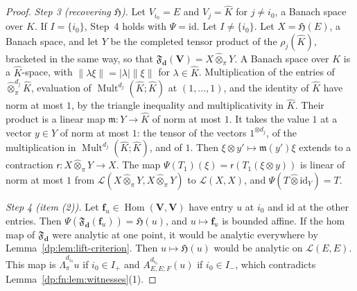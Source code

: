 \documentclass[11pt]{amsart}
\theoremstyle{definition}
\theoremstyle{remark}
\numberwithin{equation}{section}
\newcommand{\cL}{\mathcal L}
\newcommand{\Mult}{\operatorname{Mult}}
\newcommand{\id}{\mathrm{id}}
\newcommand{\abs}[1]{\lvert #1\rvert}
\newcommand{\norm}[1]{\lVert #1\rVert}
\newcommand{\Kh}{\widehat K}
\theoremstyle{plain}
\theoremstyle{definition}
\theoremstyle{plain}
\newcommand{\hot}{\mathbin{\widehat\otimes}}
\newcommand{\hLambda}{\widehat\Lambda}
\begin{document}
\begin{proof}
\emph{Step 3 (recovering $\mathfrak H$).} Let $V_{i_0}=E$ and $V_j=\Kh$ for $j\ne i_0$, a Banach space over $K$. If $I=\{i_0\}$, Step~4 holds with $\Psi=\id$. Let $I\ne\{i_0\}$. Let $X=\mathfrak H(E)$, a Banach space, and let $Y$ be the completed tensor product of the $\rho_j(\Kh)$, bracketed in the same way, so that $\mathfrak F_{\mathbf d}(\mathbf V)=X\mathbin{\widehat\otimes_\pi}Y$. A Banach space over $K$ is a $\Kh$-space, with $\norm{\lambda\xi}=\abs\lambda\norm\xi$ for $\lambda\in\Kh$. Multiplication of the entries of $\hot^{d_j}_\pi\Kh$, evaluation of $\Mult^{d_j}(\Kh;\Kh)$ at $(1,\dots,1)$, and the identity of $\Kh$ have norm at most $1$, by the triangle inequality and multiplicativity in $\Kh$. Their product is a linear map $\mathfrak m\colon Y\to\Kh$ of norm at most $1$. It takes the value $1$ at a vector $y\in Y$ of norm at most $1$: the tensor of the vectors $1^{\otimes d_j}$, of the multiplication in $\Mult^{d_j}(\Kh;\Kh)$, and of $1$. Then $\xi\otimes y'\mapsto\mathfrak m(y')\xi$ extends to a contraction $\mathsf r\colon X\mathbin{\widehat\otimes_\pi}Y\to X$. The map $\Psi(T_1)(\xi)=\mathsf r(T_1(\xi\otimes y))$ is linear of norm at most $1$ from $\cL(X\mathbin{\widehat\otimes_\pi}Y,X\mathbin{\widehat\otimes_\pi}Y)$ to $\cL(X,X)$, and $\Psi(T\mathbin{\widehat\otimes}\id_Y)=T$.

\emph{Step 4 (item (2)).} Let $\mathbf f_u\in\operatorname{Hom}(\mathbf V,\mathbf V)$ have entry $u$ at $i_0$ and $\id$ at the other entries. Then $\Psi(\mathfrak F_{\mathbf d}(\mathbf f_u))=\mathfrak H(u)$, and $u\mapsto\mathbf f_u$ is bounded affine. If the hom map of $\mathfrak F_{\mathbf d}$ were analytic at one point, it would be analytic everywhere by Lemma~\ref{dp:lem:lift-criterion}. Then $u\mapsto\mathfrak H(u)$ would be analytic on $\cL(E,E)$. This map is $\hLambda^{d_{i_0}}_\pi u$ if $i_0\in I_+$ and $A^{d_{i_0}}_{E,E;F}(u)$ if $i_0\in I_-$, which contradicts Lemma~\ref{dp:fn:lem:witnesses}(1).
\end{proof}
\end{document}
